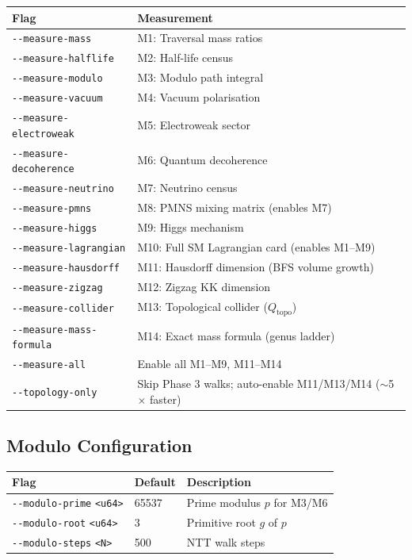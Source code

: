 \documentclass[11pt, a4paper, openany]{book}
\newcommand{\code}[1]{\texttt{#1}}
\newcommand{\flag}[1]{\texttt{-{}-#1}}
\begin{document}
\begin{longtable}{lp{10cm}}
  \toprule
  \textbf{Flag} & \textbf{Measurement} \\
  \midrule
  \flag{measure-mass}        & M1: Traversal mass ratios \\
  \flag{measure-halflife}    & M2: Half-life census \\
  \flag{measure-modulo}      & M3: Modulo path integral \\
  \flag{measure-vacuum}      & M4: Vacuum polarisation \\
  \flag{measure-electroweak} & M5: Electroweak sector \\
  \flag{measure-decoherence} & M6: Quantum decoherence \\
  \flag{measure-neutrino}    & M7: Neutrino census \\
  \flag{measure-pmns}        & M8: PMNS mixing matrix (enables M7) \\
  \flag{measure-higgs}       & M9: Higgs mechanism \\
  \flag{measure-lagrangian}  & M10: Full SM Lagrangian card (enables M1--M9) \\
  \flag{measure-hausdorff}   & M11: Hausdorff dimension (BFS volume growth) \\
  \flag{measure-zigzag}      & M12: Zigzag KK dimension \\
  \flag{measure-collider}    & M13: Topological collider ($Q_{\text{topo}}$) \\
  \flag{measure-mass-formula} & M14: Exact mass formula (genus ladder) \\
  \flag{measure-all}         & Enable all M1--M9, M11--M14 \\
  \flag{topology-only}       & Skip Phase 3 walks; auto-enable M11/M13/M14 ($\sim$5$\times$ faster) \\
  \bottomrule
\end{longtable}

\subsection{Modulo Configuration}

\begin{longtable}{llp{8cm}}
  \toprule
  \textbf{Flag} & \textbf{Default} & \textbf{Description} \\
  \midrule
  \flag{modulo-prime} \code{<u64>} & 65537 & Prime modulus $p$ for M3/M6 \\
  \flag{modulo-root} \code{<u64>}  & 3     & Primitive root $g$ of $p$ \\
  \flag{modulo-steps} \code{<N>}   & 500   & NTT walk steps \\
  \bottomrule
\end{longtable}
\end{document}
